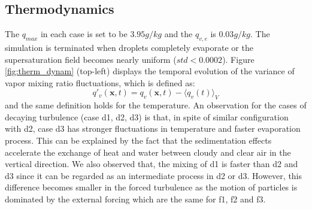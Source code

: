 \documentclass[12pt]{article}
\begin{document}
\subsection{Thermodynamics}
The $q_{max}$ in each case is set to be $3.95g/kg$ and the $q_{v,e}$ is $0.03g/kg$. The simulation is terminated when droplets completely evaporate or the supersaturation field becomes nearly uniform ($std<0.0002$). Figure \ref{fig:therm_dynam} (top-left) displays the temporal evolution of the variance of vapor mixing ratio fluctuations, which is defined as:
\[
q'_v(\mathbf{x},t) = q_v(\mathbf{x},t)-\langle q_v(t)\rangle_V
\]
and the same definition holds for the temperature. An observation for the cases of decaying turbulence (case d1, d2, d3) is that, in spite of similar configuration with d2, case d3 has stronger fluctuations in temperature and faster evaporation process. This can be explained by the fact that the sedimentation effects accelerate the exchange of heat and water between cloudy and clear air in the vertical direction. We also observed that, the mixing of d1 is faster than d2 and d3 since it can be regarded as an intermediate process in d2 or d3. However, this difference becomes smaller in the forced turbulence as the motion of particles is dominated by the external forcing which are the same for f1, f2 and f3.
\end{document}
